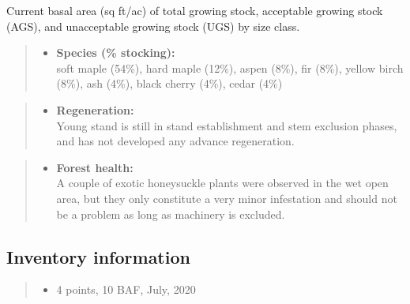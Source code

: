\documentclass[]{tufte-handout}
\providecommand{\tightlist}{%
  \setlength{\itemsep}{0pt}\setlength{\parskip}{0pt}}
\begin{document}
\vspace{2pt}
\footnotesize\parbox{200pt}{Current basal area (sq ft/ac) of total growing stock, acceptable growing stock (AGS), and unacceptable growing stock (UGS) by size class.}\normalsize

\begin{quote}
\begin{itemize}
\tightlist
\item
  \textbf{Species (\% stocking):}\\
  \vspace{2pt} soft maple (54\%), hard maple (12\%), aspen (8\%), fir
  (8\%), yellow birch (8\%), ash (4\%), black cherry (4\%), cedar (4\%)
\end{itemize}
\end{quote}

\begin{quote}
\begin{itemize}
\tightlist
\item
  \textbf{Regeneration:}\\
  \vspace{2pt} Young stand is still in stand establishment and stem
  exclusion phases, and has not developed any advance regeneration.
\end{itemize}
\end{quote}

\begin{quote}
\begin{itemize}
\tightlist
\item
  \textbf{Forest health:}\\
  \vspace{2pt} A couple of exotic honeysuckle plants were observed in
  the wet open area, but they only constitute a very minor infestation
  and should not be a problem as long as machinery is excluded.
\end{itemize}
\end{quote}

\subsection{Inventory information}\label{inventory-information-1}

\begin{quote}
\begin{itemize}
\tightlist
\item
  4 points, 10 BAF, July, 2020
\end{itemize}
\end{quote}
\end{document}
